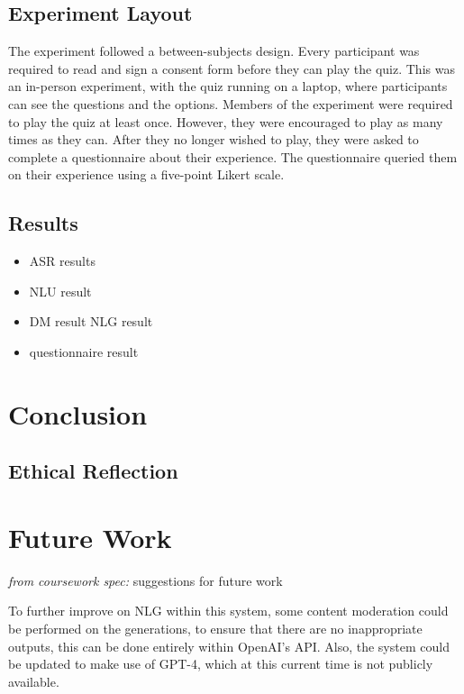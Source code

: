 \documentclass[hidelinks, 11pt]{article}
\begin{document}
\subsection{Experiment Layout}
\label{subsec:experiment_layout}
The experiment followed a between-subjects design. Every participant was required to read and sign a consent form before they can play the quiz. This was an in-person experiment, with the quiz running on a laptop, where participants can see the questions and the options. Members of the experiment were required to play the quiz at least once. However, they were encouraged to play as many times as they can. After they no longer wished to play, they were asked to complete a questionnaire about their experience. The questionnaire queried them on their experience using a five-point Likert scale.

\subsection{Results}
\label{subsec:results}

\begin{itemize}
  \item ASR results
  \item NLU result
  \item DM result
        NLG result
  \item questionnaire result
\end{itemize}

\section{Conclusion}
\label{sec:conclusion}

\subsection{Ethical Reflection}
\label{subsec:ethics}

\section{Future Work}
\label{sec:future_work}

\textit{from coursework spec:} suggestions for future work

To further improve on NLG within this system, some content moderation could be performed on the generations, to ensure that there are no inappropriate outputs, this can be done entirely within OpenAI's API.  Also, the system could be updated to make use of GPT-4, which at this current time is not publicly available.
\end{document}
